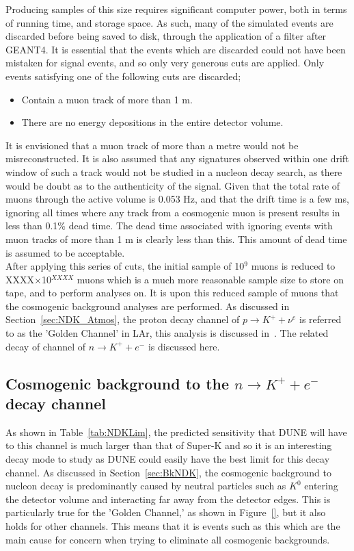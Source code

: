 Producing samples of this size requires significant computer power, both in terms of running time, and storage space. As such, many of the simulated events are discarded before being saved to disk, through the application of a filter after GEANT4. It is essential that the events which are discarded could not have been mistaken for signal events, and so only very generous cuts are applied. Only events satisfying one of the following cuts are discarded;
\begin{itemize}
\item Contain a muon track of more than 1 m.
\item There are no energy depositions in the entire detector volume.
\end{itemize}
It is envisioned that a muon track of more than a metre would not be misreconstructed. It is also assumed that any signatures observed within one drift window of such a track would not be studied in a nucleon decay search, as there would be doubt as to the authenticity of the signal. Given that the total rate of muons through the active volume is 0.053 Hz, and that the drift time is a few ms, ignoring all times where any track from a cosmogenic muon is present results in less than 0.1\% dead time. The dead time associated with ignoring events with muon tracks of more than 1 m is clearly less than this. This amount of dead time is assumed to be acceptable. \\

After applying this series of cuts, the initial sample of 10$^9$ muons is reduced to XXXX$\times$10$^{XXXX}$ muons which is a much more reasonable sample size to store on tape, and to perform analyses on. It is upon this reduced sample of muons that the cosmogenic background analyses are performed. As discussed in Section~\ref{sec:NDK_Atmos}, the proton decay channel of $p \rightarrow K^{+} + \nu^{e}$ is referred to as the 'Golden Channel' in LAr, this analysis is discussed in~\citep{NDKTFNote}. The related decay of channel of $n \rightarrow K^{+} + e^{-}$ is discussed here. \\

\subsection{Cosmogenic background to the $n \rightarrow K^{+} + e^{-}$ decay channel} \label{sec:NDKCosmBk}
As shown in Table~\ref{tab:NDKLim}, the predicted sensitivity that DUNE will have to this channel is much larger than that of Super-K and so it is an interesting decay mode to study as DUNE could easily have the best limit for this decay channel. As discussed in Section~\ref{sec:BkNDK}, the cosmogenic background to nucleon decay is predominantly caused by neutral particles such as $K^0$ entering the detector volume and interacting far away from the detector edges. This is particularly true for the 'Golden Channel,' as shown in Figure~\ref{}, but it also holds for other channels. This means that it is events such as this which are the main cause for concern when trying to eliminate all cosmogenic backgrounds. \\

